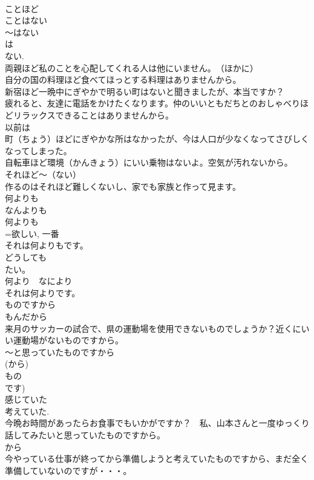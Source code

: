 \documentclass[8pt]{extreport}
\begin{document}
\begin{CJK}{UTF8}{min}
\\	ことほど
\\	ことはない
\\	～はない 
\\	は 
\\	ない. 
\\	両親ほど私のことを心配してくれる人は他にいません。　（ほかに）
\\	自分の国の料理ほど食べてほっとする料理はありませんから。
\\	新宿ほど一晩中にぎやかで明るい町はないと聞きましたが、本当ですか？
\\	疲れると、友達に電話をかけたくなります。仲のいいともだちとのおしゃべりほどリラックスできることはありませんから。
\\	以前は
\\	町（ちょう）ほどにぎやかな所はなかったが、今は人口が少なくなってさびしくなってしまった。
\\	自転車ほど環境（かんきょう）にいい乗物はないよ。空気が汚れないから。
\\	それほど～（ない）
\\	作るのはそれほど難しくないし、家でも家族と作って見ます。
\\	何よりも
\\	なんよりも
\\	何よりも
\\	=欲しい, 一番
\\	それは何よりもです。　
\\	どうしても
\\	たい。　
\\	何より　なにより
\\	それは何よりです。
\\	ものですから
\\	もんだから
\\	来月のサッカーの試合で、県の運動場を使用できないものでしょうか？近くにいい運動場がないものですから。
\\	～と思っていたものですから
\\	(から) 
\\	もの
\\	です) 
\\	感じていた 
\\	考えていた.
\\	今晩お時間があったらお食事でもいかがですか？　私、山本さんと一度ゆっくり話してみたいと思っていたものですから。
\\	から 
\\	今やっている仕事が終ってから準備しようと考えていたものですから、まだ全く準備していないのですが・・・。

\end{CJK}
\end{document}
